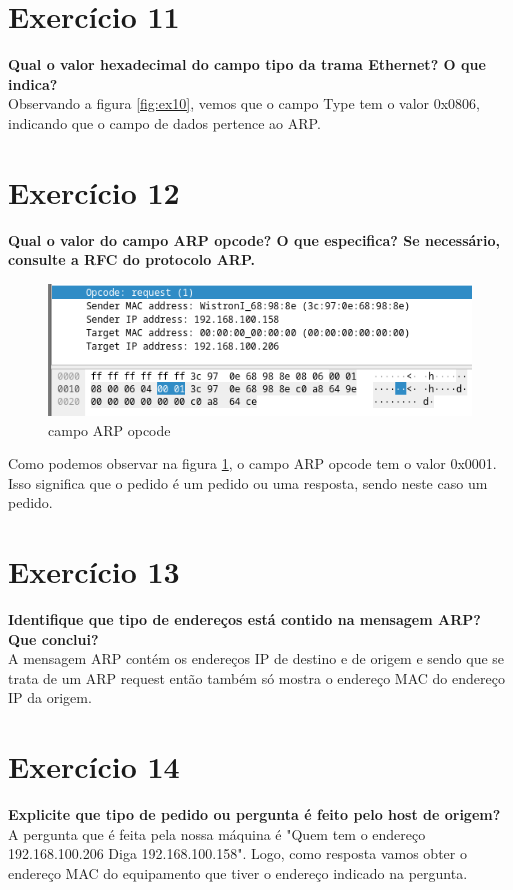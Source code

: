 \documentclass[a4paper]{report}
\begin{document}
\section{Exercício 11}
\textbf{Qual o valor hexadecimal do campo tipo da trama Ethernet? O que
indica?}\\
Observando a figura \ref{fig:ex10}, vemos que o campo Type tem o valor 0x0806, 
indicando que o campo de dados pertence ao ARP.

\section{Exercício 12}
\textbf{Qual o valor do campo ARP opcode? O que especifica?  Se necessário,
consulte a RFC do protocolo ARP.}

\begin{figure}[H]
    \centering 
    \includegraphics[width=\textwidth]{images/ex12.png}
    \caption{campo ARP opcode}
    \label{fig:ex12}
\end{figure}
Como podemos observar na figura \ref{fig:ex12}, o campo ARP opcode tem o valor
0x0001. Isso significa que o pedido é um pedido ou uma resposta, sendo neste
caso um pedido.

\section{Exercício 13}
\textbf{Identifique que tipo de endereços está contido na mensagem ARP? Que
conclui?}\\
A mensagem ARP contém os endereços IP de destino e de origem e sendo que se
trata de um ARP request então também só mostra o endereço MAC do endereço IP da
origem.

\section{Exercício 14}
\textbf{Explicite que tipo de pedido ou pergunta é feito pelo host de origem?}\\
A pergunta que é feita pela nossa máquina é "Quem tem o endereço 192.168.100.206
Diga 192.168.100.158". Logo, como resposta vamos obter o endereço MAC do
equipamento que tiver o endereço indicado na pergunta.
\end{document}
